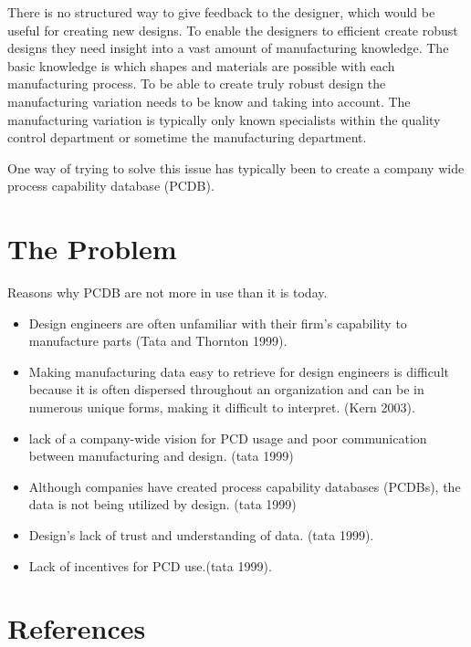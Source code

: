 \documentclass[aip,amsmath,reprint, author-year]{revtex4-1}
\begin{document}
 

 
There is no structured way to give feedback to the designer, which would be useful for creating new designs. 
To enable the designers to efficient create robust designs they need insight into a vast amount of manufacturing knowledge. 
The basic knowledge is which shapes and materials are possible with each manufacturing process. 
To be able to create truly robust design the manufacturing variation needs to be know and taking into account. The manufacturing variation is typically only known specialists within the quality control department or sometime the manufacturing department. 



One way of trying to solve this issue has typically been to create a company wide process capability database (PCDB). 

\section{The Problem}

Reasons why PCDB are not more in use than it is today.

\begin{itemize}

\item{Design engineers are often unfamiliar with their firm’s capability to manufacture parts (Tata and Thornton 1999).}
\item{Making manufacturing data easy to retrieve for design engineers is difficult because it is often dispersed throughout an organization and can be in numerous unique forms, making it difficult to interpret. (Kern 2003).}
\item{lack of a company-wide vision for PCD usage and poor communication between manufacturing and design. (tata 1999)}
\item{Although companies have created process capability databases (PCDBs), the data is not being utilized by design. (tata 1999)}
\item{Design’s lack of trust and understanding of data. (tata 1999).}
\item{Lack of incentives for PCD use.(tata 1999).}



\end{itemize} 



\section*{References}

\end{document}
